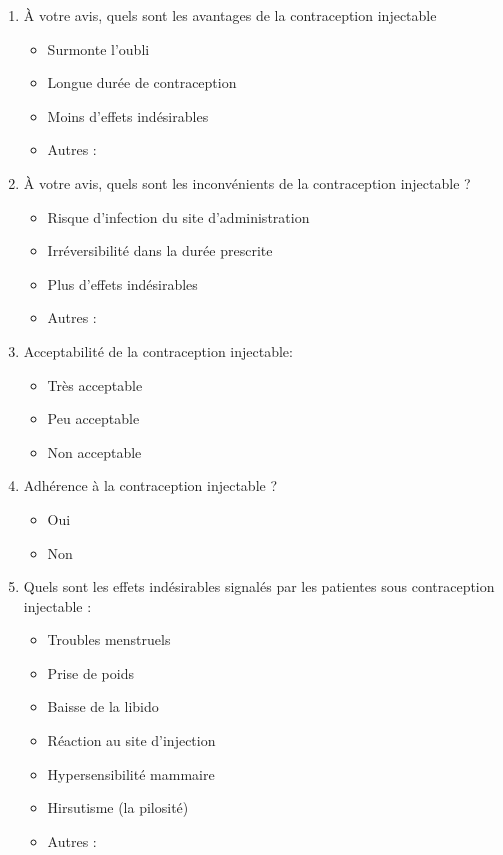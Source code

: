 \begin{enumerate}[label=\arabic*.]
  \item	À votre avis, quels sont les avantages de la contraception \newline injectable 
    \begin{itemize}[label=$\square$]
      \item Surmonte l’oubli 
      \item Longue durée de contraception 
      \item Moins d’effets indésirables 
      \item Autres : 
    \end{itemize} 
    \vspace{2em}

  \item	À votre avis, quels sont les inconvénients de la contraception injectable ? 
    \begin{itemize}[label=$\square$]
      \item Risque d’infection du site d’administration
      \item Irréversibilité dans la durée prescrite
      \item Plus d’effets indésirables
      \item Autres : 
    \end{itemize} 
    \vspace{2em}

  \item Acceptabilité de la contraception injectable:
    \begin{itemize}[label=$\square$]
      \item Très acceptable 
      \item Peu acceptable 
      \item Non acceptable 
    \end{itemize}
    \vspace{2em}

  \item Adhérence à la contraception injectable ? 
    \begin{itemize}[label=$\square$]
      \item Oui 
      \item Non 
    \end{itemize}
    \vspace{2em}

  \item Quels sont les effets indésirables signalés par les patientes sous contraception injectable : 
    \begin{itemize}[label=$\square$]
      \item Troubles menstruels 
      \item Prise de poids 
      \item Baisse de la libido 
      \item Réaction au site d’injection 
      \item Hypersensibilité mammaire 
      \item Hirsutisme (la pilosité) 
      \item Autres : 
    \end{itemize} 
    \vspace{2em}


\end{enumerate}
